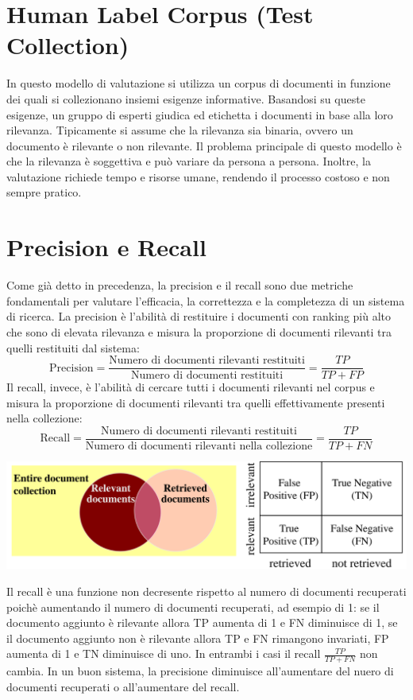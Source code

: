 \documentclass{report}
\begin{document}
	\section{Human Label Corpus (Test Collection)}
	In questo modello di valutazione si utilizza un corpus di documenti in funzione dei quali si collezionano insiemi esigenze informative. Basandosi su queste esigenze, un gruppo di esperti giudica ed etichetta i documenti in base alla loro rilevanza. Tipicamente si assume che la rilevanza sia binaria, ovvero un documento è rilevante o non rilevante. Il problema principale di questo modello è che la rilevanza è soggettiva e può variare da persona a persona. Inoltre, la valutazione richiede tempo e risorse umane, rendendo il processo costoso e non sempre pratico.
	
	\section{Precision e Recall}
	Come già detto in precedenza, la precision e il recall sono due metriche fondamentali per valutare l'efficacia, la correttezza e la completezza di un sistema di ricerca. La precision è l'abilità di restituire i documenti con ranking più alto che sono di elevata rilevanza e misura la proporzione di documenti rilevanti tra quelli restituiti dal sistema:
	\[
		\text{Precision} = \frac{\text{Numero di documenti rilevanti restituiti}}{\text{Numero di documenti restituiti}} = \frac{TP}{TP + FP}
	\]
	Il recall, invece, è l'abilità di cercare tutti i documenti rilevanti nel corpus e misura la proporzione di documenti rilevanti tra quelli effettivamente presenti nella collezione:
	\[
		\text{Recall} = \frac{\text{Numero di documenti rilevanti restituiti}}{\text{Numero di documenti rilevanti nella collezione}} = \frac{TP}{TP + FN}
	\]
	\begin{center}
		\includegraphics[scale=0.5]{assets/precision-recall.png}
	\end{center}
	Il recall è una funzione non decresente rispetto al numero di documenti recuperati poichè aumentando il numero di documenti recuperati, ad esempio di 1: se il documento aggiunto è rilevante allora TP aumenta di 1 e FN diminuisce di 1, se il documento aggiunto non è rilevante allora TP e FN rimangono invariati, FP aumenta di 1 e TN diminuisce di uno. In entrambi i casi il recall $\frac{TP}{TP + FN}$ non cambia. In un buon sistema, la precisione diminuisce all'aumentare del nuero di documenti recuperati o all'aumentare del recall.
\end{document}
